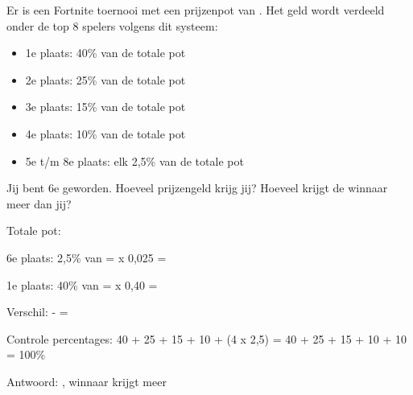 \begin{opgave}
Er is een Fortnite toernooi met een prijzenpot van . Het geld
wordt verdeeld onder de top 8 spelers volgens dit systeem:

\begin{itemize}
\item 1e plaats: 40\% van de totale pot
\item 2e plaats: 25\% van de totale pot
\item 3e plaats: 15\% van de totale pot
\item 4e plaats: 10\% van de totale pot
\item 5e t/m 8e plaats: elk 2,5\% van de totale pot
\end{itemize}

Jij bent 6e geworden. Hoeveel prijzengeld krijg jij? Hoeveel krijgt de winnaar
meer dan jij?
\end{opgave}

\begin{oplossing}
Totale pot: 

6e plaats: 2,5\% van  =  x 0,025 = 

1e plaats: 40\% van  =  x 0,40 = 

Verschil:  -  = 

Controle percentages: 40 + 25 + 15 + 10 + (4 x 2,5) = 40 + 25 + 15 + 10 + 10 = 100\%

Antwoord: , winnaar krijgt  meer
\end{oplossing}